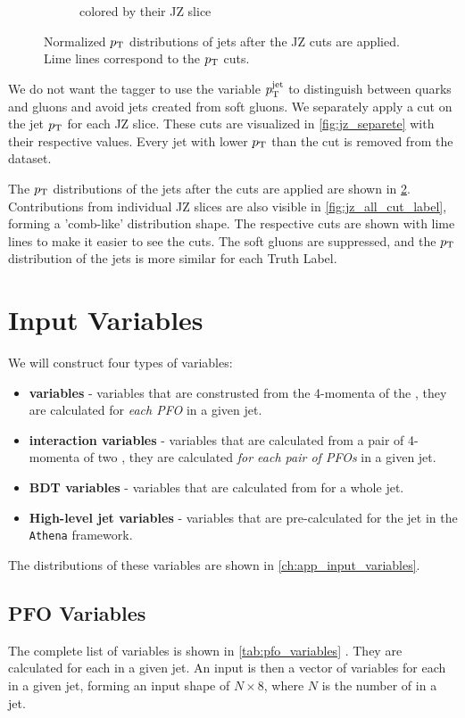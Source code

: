 \begin{figure}[htb]
\begin{subfigure}[t]{0.49\textwidth}
        \caption{colored by their JZ slice}
        \label{fig:jz_all_cut_jz}
    \end{subfigure}
    \caption{Normalized $p_\text{T}$ distributions of jets after the JZ cuts are applied. Lime lines correspond to the $p_\text{T}$ cuts.}
    \label{fig:jz_all_cut}
\end{figure}
We do not want the tagger to use the variable $p_\text{T}^{\mathrm{jet}}$ to distinguish between quarks and gluons and avoid jets created from soft gluons.
We separately apply a cut on the jet $p_\text{T}$ for each JZ slice.
These cuts are visualized in \cref{fig:jz_separete} with their respective values.
Every jet with lower $p_\text{T}$ than the cut is removed from the dataset.

The $p_\text{T}$ distributions of the jets after the cuts are applied are shown in \cref{fig:jz_all_cut}.
Contributions from individual JZ slices are also visible in \cref{fig:jz_all_cut_label}, forming a 'comb-like' distribution shape.
The respective cuts are shown with lime lines to make it easier to see the cuts.
The soft gluons are suppressed, and the $p_\text{T}$ distribution of the jets is more similar for each Truth Label. 


\FloatBarrier
\section{Input Variables}
\label{sec:input_variables}
We will construct four types of variables:
\begin{itemize}
    \item \textbf{\PFO variables} - variables that are construsted from the 4-momenta of the \PFOs, they are calculated for \emph{each PFO} in a given jet.
    \item \textbf{\PFO interaction variables} - variables that are calculated from a pair of 4-momenta of two \PFOs, they are calculated \emph{for each pair of PFOs} in a given jet.
    \item \textbf{BDT variables} - variables that are calculated from \PFOs for a whole jet.
    \item \textbf{High-level jet variables} - variables that are pre-calculated for the jet in the \texttt{Athena} framework.
\end{itemize}
The distributions of these variables are shown in \cref{ch:app_input_variables}.

\subsection{PFO Variables}
\label{sec:pfo_variables}

The complete list of \PFO variables is shown in \cref{tab:pfo_variables} \cite{part}.
They are calculated for each \PFO in a given jet.
An input is then a vector of \PFO variables for each \PFO in a given jet, forming an input shape of $N \times 8$, where $N$ is the number of \PFOs in a jet.

